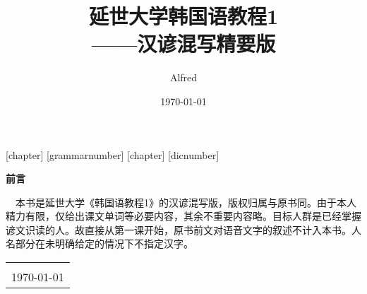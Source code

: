 \title{{\Huge{\textbf{延世大学韩国语教程1}}}\\——汉谚混写精要版}
\author{Alfred}
\date{\today}
\linespread{1.5}
\setsansfont[Mapping=tex-text, Scale=MatchLowercase]{TH-Times.TTF}
\setmonofont[Scale=MatchLowercase]{TH-Times.TTF}
[chapter]
[grammarnumber]
\renewcommand{\thegrammarsection}{\arabic{chapter}.\arabic{grammarnumber} G\arabic{grammarsection}}
\newenvironment{grammar}{\stepcounter{grammarnumber}}{}
\newenvironment{grammarsect}[1][]{\refstepcounter{grammarsection}\par\noindent{\large\arabic{chapter}.\arabic{grammarnumber} G\arabic{grammarsection} #1}\addcontentsline{toc}{subsection}{\thegrammarsection {}  #1}}{\par}
[chapter]
[dicnumber]
\newenvironment{dic}{\stepcounter{dicnumber}}{}
\newenvironment{dicsect}{\stepcounter{dicsection}\par\noindent{\large\arabic{chapter}.\arabic{dicnumber} D\arabic{dicsection}\\}}{\par}


\hypersetup{
    colorlinks=true,
    linkcolor=blue,
    filecolor=blue,
    urlcolor=blue,
    citecolor=cyan,
}
\newcommand{\kr}{\CJKfamily{hanr}}


\maketitle

\setcounter{page}{1}

\begin{center}
    \Huge\textbf{前言}
\end{center}~\
本书是延世大学《韩国语教程1》的汉谚混写版，版权归属与原书同。由于本人精力有限，仅给出课文单词等必要内容，其余不重要内容略。目标人群是已经掌握谚文识读的人。故直接从第一课开始，原书前文对语音文字的叙述不计入本书。人名部分在未明确给定的情况下不指定汉字。
~\
\begin{flushright}
    \begin{tabular}{c}
        \aruby{Alfred}{알프레드}\\
        \today
    \end{tabular}
\end{flushright}

\newpage
{}
\setcounter{page}{1}
\tableofcontents
\newpage
\setcounter{page}{1}

